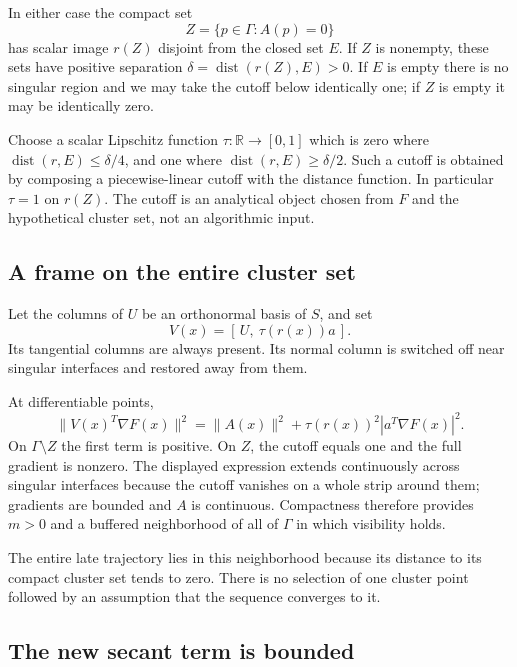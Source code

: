 In either case the compact set \[
 Z=\{p\in\Gamma:A(p)=0\}
\] has scalar image \(r(Z)\) disjoint from the closed set \(E\). If
\(Z\) is nonempty, these sets have positive separation
\(\delta=\operatorname{dist}(r(Z),E)>0\). If \(E\) is empty there is no
singular region and we may take the cutoff below identically one; if
\(Z\) is empty it may be identically zero.

Choose a scalar Lipschitz function \(\tau:\mathbb R\to[0,1]\) which is
zero where \(\operatorname{dist}(r,E)\le\delta/4\), and one where
\(\operatorname{dist}(r,E)\ge\delta/2\). Such a cutoff is obtained by
composing a piecewise-linear cutoff with the distance function. In
particular \(\tau=1\) on \(r(Z)\). The cutoff is an analytical object
chosen from \(F\) and the hypothetical cluster set, not an algorithmic
input.



\subsection{A frame on the entire cluster
set}\label{U:a-frame-on-the-entire-cluster-set}

Let the columns of \(U\) be an orthonormal basis of \(S\), and set \[
 \boxed{V(x)=[\,U,\ \tau(r(x))a\,].}\tag{11.12}
\] Its tangential columns are always present. Its normal column is
switched off near singular interfaces and restored away from them.

At differentiable points, \[
 \|V(x)^T\nabla F(x)\|^2
 =\|A(x)\|^2+\tau(r(x))^2|a^T\nabla F(x)|^2.
\] On \(\Gamma\setminus Z\) the first term is positive. On \(Z\), the
cutoff equals one and the full gradient is nonzero. The displayed
expression extends continuously across singular interfaces because the
cutoff vanishes on a whole strip around them; gradients are bounded and
\(A\) is continuous. Compactness therefore provides \(m>0\) and a
buffered neighborhood of all of \(\Gamma\) in which visibility holds.

The entire late trajectory lies in this neighborhood because its
distance to its compact cluster set tends to zero. There is no selection
of one cluster point followed by an assumption that the sequence
converges to it.



\subsection{The new secant term is
bounded}\label{U:the-new-secant-term-is-bounded}


